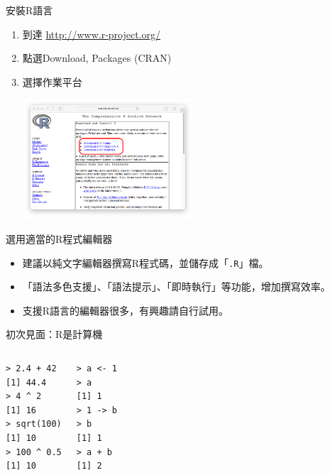 \documentclass[12pt, aspectratio=43]{beamer}
\let\oldfootnote\footnote
\renewcommand\footnote[1]{\hspace{-0.3em}\oldfootnote{\ignorespaces#1}\hspace{0.3em}}
\begin{document}
\begin{frame}[fragile]{安裝R語言}
\begin{enumerate}
\item 到達 \url{http://www.r-project.org/}
\item 點選Download, Packages (CRAN) \\
\item 選擇作業平台
	\begin{center}\includegraphics[width=0.5\textwidth]{downloadR.png}\end{center}
\end{enumerate}
\end{frame}

\begin{frame}[fragile]{選用適當的R程式編輯器}
\begin{itemize}
\item 建議以純文字編輯器撰寫R程式碼，並儲存成「\verb+.R+」檔。
\item 「語法多色支援」、「語法提示」、「即時執行」等功能，增加撰寫效率。
\item 支援R語言的編輯器很多，有興趣請自行試用。
\end{itemize}
\end{frame}


\begin{frame}[fragile]{初次見面：R是計算機}
\begin{columns}
\begin{verbatim}
> 2.4 + 42
[1] 44.4
> 4 ^ 2
[1] 16
> sqrt(100)
[1] 10
> 100 ^ 0.5
[1] 10
\end{verbatim}

\begin{verbatim}
> a <- 1
> a
[1] 1
> 1 -> b
> b
[1] 1
> a + b
[1] 2
\end{verbatim}

\end{columns}
\end{frame}
\end{document}
